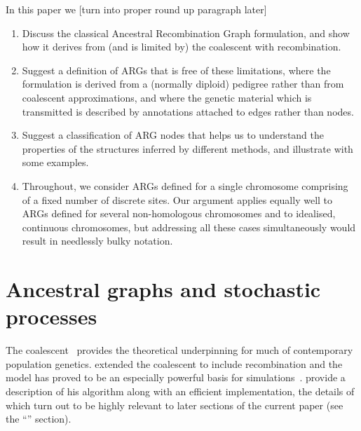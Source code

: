 \documentclass{article}
\begin{document}
In this paper we [turn into proper round up paragraph later]
\begin{enumerate}
\item Discuss the classical Ancestral Recombination Graph formulation,
and show how it derives from (and is limited by) the coalescent with
recombination.
\item Suggest a definition of ARGs that is free of these limitations,
where the formulation is derived from a (normally diploid) pedigree rather than from
coalescent approximations, and where the genetic
material which is transmitted is described by annotations attached to
edges rather than nodes.
\item Suggest a classification of ARG nodes that helps us to understand
the properties of the structures inferred by different methods, and illustrate
with some examples.
\item Throughout, we consider ARGs defined for a single chromosome comprising
of a fixed number of discrete sites. Our argument applies equally well to ARGs
defined for several non-homologous chromosomes \citep{fearnhead2003ancestral,
koskela2019robust} and to idealised, continuous chromosomes, but addressing
all these cases simultaneously would result in needlessly bulky notation.
\end{enumerate}

\section*{Ancestral graphs and stochastic processes}
The coalescent~\citep{kingman1982coalescent,kingman1982genealogy,
hudson1983testing, tajima1983evolutionary}
provides the theoretical underpinning for much of contemporary population genetics.
\citet{hudson1983properties,hudson1990gene} extended the coalescent to include
recombination
and the model has proved to be an especially powerful basis for
simulations~\citep{hudson2002generating,baumdicker2021efficient}.
\cite{kelleher2016efficient} provide a description of his algorithm along with
an efficient implementation, the details of which turn out to be highly relevant to
later sections of the current paper (see the ``'' section).
\end{document}
